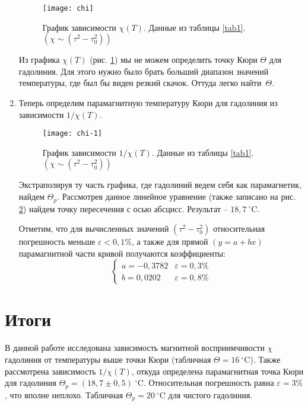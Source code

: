 \documentclass{lab}
\newcommand{\Cd}{^{\circ}\mathrm{C}}
\begin{document}
\begin{enumerate}
\begin{figure}[H]
	\centering
	\texttt{[image: chi]}
	\caption{\footnotesize
		График зависимости $ \chi(T) $. Данные из таблицы \ref{tab1}.\\
		$ \left( \chi \sim (\tau^2 - \tau_0^2) \right) $
	}
	\label{chi}
\end{figure}

Из графика $ \chi(T) $ (рис. \ref{chi}) мы не можем определить точку Кюри $ \Theta $ для
гадолиния. Для этого нужно было брать больший диапазон значений температуры, где был бы виден
резкий скачок. Оттуда легко найти~$ \Theta $.

\item
Теперь определим парамагнитную температуру Кюри для гадолиния из зависимости $ 1/\chi(T) $.
\vspace{-0.5cm}
\begin{figure}[H]
	\centering
	\texttt{[image: chi-1]}
	\caption{\footnotesize
		График зависимости $ 1/\chi(T) $. Данные из таблицы \ref{tab1}.\\
		$ \left( \chi \sim (\tau^2 - \tau_0^2) \right) $
	}
	\label{chi-1}
\end{figure}
\vspace{-0.5cm}
Экстраполируя ту часть графика, где гадолиний ведем себя как парамагнетик, найдем $ \Theta_p $.
Рассмотрев данное линейное уравнение (также записано на рис. \ref{chi-1}) найдем точку
пересечения с осью абсцисс. Результат -- $ 18,7~\Cd $.

Отметим, что для вычисленных значений $ (\tau^2 - \tau_0^2) $ относительная погрешность
меньше $ \varepsilon < 0,1\% $, а также для прямой $ (y = a + bx) $ парамагнитной части кривой
получаются коэффициенты:
\vspace{-0.4cm}
\begin{equation}
\begin{cases}
a = -0,3782		&\varepsilon = 0,3\%	\\
b = 0,0202		&\varepsilon = 0,8\%
\end{cases}
\end{equation}
\end{enumerate}

\section*{Итоги}
\hspace*{\parindent}
В данной работе исследована зависимость магнитной восприимчивости $ \chi $ гадолиния от
температуры выше точки Кюри (табличная $ \Theta = 16~\Cd $). Также рассмотрена зависимость
$ 1/\chi(T) $, откуда определена парамагнитная точка Кюри для гадолиния
$ \Theta_p = (18,7 \pm 0,5)~\Cd $. Относительная погрешность равна $ \varepsilon = 3\% $, что
вполне неплохо. Табличная $ \Theta_p = 20~\Cd $ для чистого гадолиния.
\end{document}
